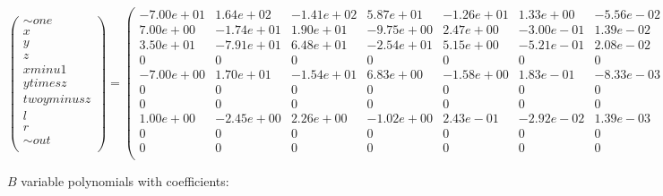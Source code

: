 \documentclass[11pt]{article}
\begin{document}
\(\begin{pmatrix} \sim{one} \\ x \\ y \\ z \\ xminu1 \\ ytimesz \\ twoyminusz \\ l \\ r \\ \sim{out} \\ \end{pmatrix} = \begin{pmatrix} -7.00e+01& 1.64e+02& -1.41e+02& 5.87e+01& -1.26e+01& 1.33e+00& -5.56e-02 \\ 7.00e+00& -1.74e+01& 1.90e+01& -9.75e+00& 2.47e+00& -3.00e-01& 1.39e-02 \\ 3.50e+01& -7.91e+01& 6.48e+01& -2.54e+01& 5.15e+00& -5.21e-01& 2.08e-02 \\ 0&0&0&0&0&0&0 \\ -7.00e+00& 1.70e+01& -1.54e+01& 6.83e+00& -1.58e+00& 1.83e-01& -8.33e-03 \\ 0&0&0&0&0&0&0 \\ 0&0&0&0&0&0&0 \\ 1.00e+00& -2.45e+00& 2.26e+00& -1.02e+00& 2.43e-01& -2.92e-02& 1.39e-03 \\ 0&0&0&0&0&0&0 \\ 0&0&0&0&0&0&0 \\ \end{pmatrix} \cdot \begin{pmatrix} 1 \\ x \\ x^2 \\ x^3 \\ x^4 \\ x5 \\ x6 \end{pmatrix}\)

\(B\) variable polynomials with coefficients:
\end{document}
